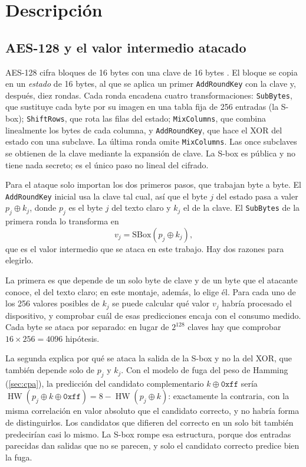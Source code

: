 \chapter{Descripción}
\label{cap:descripcion}

\section{AES-128 y el valor intermedio atacado}
\label{sec:aes}

AES-128 cifra bloques de 16 bytes con una clave de 16 bytes
\cite{nist2023fips197}. El bloque se copia en un \emph{estado} de 16 bytes, al
que se aplica un primer \texttt{AddRoundKey} con la clave y, después, diez
rondas. Cada ronda encadena cuatro transformaciones: \texttt{SubBytes}, que
sustituye cada byte por su imagen en una tabla fija de 256 entradas (la S-box);
\texttt{ShiftRows}, que rota las filas del estado; \texttt{MixColumns}, que
combina linealmente los bytes de cada columna, y \texttt{AddRoundKey}, que hace
el XOR del estado con una subclave. La última ronda omite \texttt{MixColumns}.
Las once subclaves se obtienen de la clave mediante la expansión de clave. La
S-box es pública y no tiene nada secreto; es el único paso no lineal del
cifrado.

Para el ataque solo importan los dos primeros pasos, que trabajan byte a byte.
El \texttt{AddRoundKey} inicial usa la clave tal cual, así que el byte $j$ del
estado pasa a valer $p_j \oplus k_j$, donde $p_j$ es el byte $j$ del texto
claro y $k_j$ el de la clave. El \texttt{SubBytes} de la primera ronda lo
transforma en
\begin{equation}
  v_j = \mathrm{SBox}(p_j \oplus k_j),
  \label{eq:valor-intermedio}
\end{equation}
que es el valor intermedio que se ataca en este trabajo. Hay dos razones para
elegirlo.

La primera es que depende de un solo byte de clave y de un byte que el atacante
conoce, el del texto claro; en este montaje, además, lo elige él. Para cada
uno de los 256 valores posibles de $k_j$ se puede calcular qué valor $v_j$
habría procesado el
dispositivo, y comprobar cuál de esas predicciones encaja con el consumo medido.
Cada byte se ataca por separado: en lugar de $2^{128}$ claves hay que
comprobar $16 \times 256 = 4096$ hipótesis.

La segunda explica por qué se ataca la salida de la S-box y no la del XOR, que
también depende solo de $p_j$ y $k_j$. Con el modelo de fuga del peso de
Hamming (\cref{sec:cpa}), la predicción del candidato complementario
$k \oplus \mathtt{0xff}$ sería $\operatorname{HW}(p_j \oplus k \oplus
\mathtt{0xff}) = 8 - \operatorname{HW}(p_j \oplus k)$: exactamente la contraria,
con la misma correlación en valor absoluto que el candidato correcto, y no
habría forma de distinguirlos. Los candidatos que difieren del correcto en un
solo bit también predecirían casi lo mismo. La S-box rompe esa estructura,
porque dos entradas parecidas dan salidas que no se parecen, y solo el candidato
correcto predice bien la fuga.

